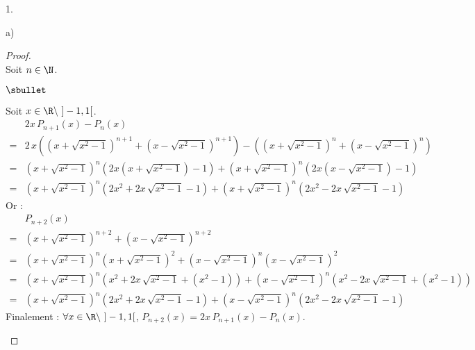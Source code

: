 \documentclass[11pt]{article}%
\begin{document}
\begin{exerciceAP}
\begin{noliste}{1.}
\begin{noliste}{a)}
      \begin{proof}~\\
        Soit $n \in \N$.
        \begin{noliste}{$\sbullet$}
        \item Soit $x \in \R \setminus \ ]-1,1[$.
          \[
            \begin{array}{cl}
              & 2x \, P_{n+1}(x) - P_n(x)
              \\[.2cm]
              = & 2 \, x \left(\left(x + \sqrt{x^2-1}\right)^{n+1} +
                    \left(x - \sqrt{x^2-1}\right)^{n+1} \right) -
                    \left( \left(x+ \sqrt{x^2-1} \right)^n + \left(x -
                    \sqrt{x^2-1} \right)^n\right)
              \\[.6cm]
              = & \left(x + \sqrt{x^2-1}\right)^n \left(2x \left(x +
                  \sqrt{x^2-1} \right) -1\right) + \left(x +
                  \sqrt{x^2-1} \right)^n \left(2x \left(x -
                  \sqrt{x^2-1}\right) -1 \right)
              \\[.6cm]
              = & \left(x + \sqrt{x^2-1}\right)^n \left(2x^2 + 2x \,
                  \sqrt{x^2-1} -1\right) + \left(x +
                  \sqrt{x^2-1} \right)^n \left(2x^2 - 2x \,
                  \sqrt{x^2-1} -1 \right)
            \end{array}
          \]
          Or :
          \[
            \begin{array}{cl}
              & P_{n+2}(x)
              \\[.2cm]
              = & \left(x + \sqrt{x^2-1} \right)^{n+2} + \left(x -
                    \sqrt{x^2-1} \right)^{n+2}
              \\[.6cm]
              = & \left(x + \sqrt{x^2-1} \right)^{n} \left(x + \sqrt{x^2-1}\right)^2
                  + \left(x - \sqrt{x^2-1} \right)^{n} \left(x -
                  \sqrt{x^2-1}\right)^2
              \\[.6cm]
              = & \left(x + \sqrt{x^2-1} \right)^{n} \left(x^2 + 2x \,
                  \sqrt{x^2-1} + (x^2-1) \right)
                  + \left(x - \sqrt{x^2-1} \right)^{n} \left(x^2 - 2x \,
                  \sqrt{x^2-1} + (x^2-1)\right)
              \\[.6cm]
              = & \left(x + \sqrt{x^2-1} \right)^{n} \left(2x^2 + 2x \,
                  \sqrt{x^2-1} -1 \right)
                  + \left(x - \sqrt{x^2-1} \right)^{n} \left(2x^2 - 2x \,
                  \sqrt{x^2-1} -1\right)
            \end{array}
          \]
          Finalement : $\forall x \in \R \setminus \ ]-1,1[$,
          $P_{n+2}(x) = 2x \, P_{n+1}(x) - P_n(x)$.
          

\end{noliste}
\end{proof}
\end{noliste}
\end{noliste}
\end{exerciceAP}
\end{document}
